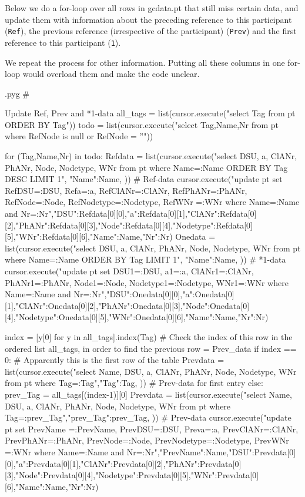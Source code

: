 \documentclass{report}
\makeatletter
\newcommand{\mi}[1]{\lstinline{#1}}
\newenvironment{python}{%
  \VerbatimEnvironment
  \minted@resetoptions
  \setkeys{minted@opt}{}
      \begin{VerbatimOut}{\jobname.pyg}}
{%
      \end{VerbatimOut}
      \minted@pygmentize{python}
      \DeleteFile{\jobname.pyg}}
\makeatother
\begin{document}
Below we do a for-loop over all rows in gcdata.pt that still miss certain data,
and update them with information about the preceding reference to this participant (\mi{Ref}),
the previous reference (irrespective of the participant) (\mi{Prev}) and the first reference
to this participant (\mi{1}).

We repeat the process for other information. Putting all these columns in one
for-loop would overload them and make the code unclear.

\begin{python}
#{{{ Update Ref, Prev and *1-data
all_tags = list(cursor.execute("select Tag from pt ORDER BY Tag"))
todo = list(cursor.execute("select Tag,Name,Nr from pt where RefNode is null or RefNode = ''"))

for (Tag,Name,Nr) in todo:
    Refdata = list(cursor.execute("select DSU, a, ClANr, PhANr, Node, Nodetype, WNr from pt where Name=:Name ORDER BY Tag DESC LIMIT 1", {"Name":Name, })) # Ref-data
    cursor.execute("update pt set RefDSU=:DSU, Refa=:a, RefClANr=:ClANr, RefPhANr=:PhANr, RefNode=:Node, RefNodetype=:Nodetype, RefWNr =:WNr where Name=:Name and Nr=:Nr",{"DSU":Refdata[0][0],"a":Refdata[0][1],"ClANr":Refdata[0][2],"PhANr":Refdata[0][3],"Node":Refdata[0][4],"Nodetype":Refdata[0][5],"WNr":Refdata[0][6],"Name":Name,"Nr":Nr}) 
    Onedata = list(cursor.execute("select DSU, a, ClANr, PhANr, Node, Nodetype, WNr from pt where Name=:Name ORDER BY Tag LIMIT 1", {"Name":Name, })) # *1-data
    cursor.execute("update pt set DSU1=:DSU, a1=:a, ClANr1=:ClANr, PhANr1=:PhANr, Node1=:Node, Nodetype1=:Nodetype, WNr1=:WNr where Name=:Name and Nr=:Nr",{"DSU":Onedata[0][0],"a":Onedata[0][1],"ClANr":Onedata[0][2],"PhANr":Onedata[0][3],"Node":Onedata[0][4],"Nodetype":Onedata[0][5],"WNr":Onedata[0][6],"Name":Name,"Nr":Nr}) 

    index = [y[0] for y in all_tags].index(Tag)  # Check the index of this row in the ordered list all_tags, in order to find the previous row = Prev_data 
    if index == 0:  # Apparently this is the first row of the table
        Prevdata = list(cursor.execute("select Name, DSU, a, ClANr, PhANr, Node, Nodetype, WNr from pt where Tag=:Tag",{"Tag":Tag, })) # Prev-data for first entry
    else:
        prev_Tag = all_tags[(index-1)][0]
        Prevdata = list(cursor.execute("select Name, DSU, a, ClANr, PhANr, Node, Nodetype, WNr from pt where Tag=:prev_Tag",{"prev_Tag":prev_Tag, })) # Prev-data
    cursor.execute("update pt set PrevName =:PrevName, PrevDSU=:DSU, Preva=:a, PrevClANr=:ClANr, PrevPhANr=:PhANr, PrevNode=:Node, PrevNodetype=:Nodetype, PrevWNr =:WNr where Name=:Name and Nr=:Nr",{"PrevName":Name,"DSU":Prevdata[0][0],"a":Prevdata[0][1],"ClANr":Prevdata[0][2],"PhANr":Prevdata[0][3],"Node":Prevdata[0][4],"Nodetype":Prevdata[0][5],"WNr":Prevdata[0][6],"Name":Name,"Nr":Nr}) 

}}}
\end{python}
\end{document}
